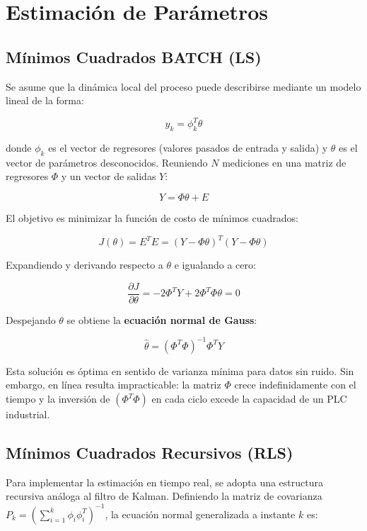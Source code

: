 \clearpage
\section{Estimación de Parámetros}

\subsection{Mínimos Cuadrados BATCH (LS)}

Se asume que la dinámica local del proceso puede describirse mediante un modelo lineal de la forma:

\[
  y_k = \phi_k^T \theta
\]

donde $\phi_k$ es el vector de regresores (valores pasados de entrada y salida) y $\theta$ es el vector de parámetros desconocidos. Reuniendo $N$ mediciones en una matriz de regresores $\Phi$ y un vector de salidas $Y$:

\[
  Y = \Phi\theta + E
\]

El objetivo es minimizar la función de costo de mínimos cuadrados:

\[
  J(\theta) = E^TE = (Y - \Phi\theta)^T(Y - \Phi\theta)
\]

Expandiendo y derivando respecto a $\theta$ e igualando a cero:

\[
  \frac{\partial J}{\partial \theta} = -2\Phi^TY + 2\Phi^T\Phi\theta = 0
\]

Despejando $\theta$ se obtiene la \textbf{ecuación normal de Gauss}:

\begin{equation}
  \hat{\theta} = (\Phi^T\Phi)^{-1}\Phi^T Y
  \label{eq:gauss-normal}
\end{equation}

Esta solución es óptima en sentido de varianza mínima para datos sin ruido. Sin embargo, en línea resulta impracticable: la matriz $\Phi$ crece indefinidamente con el tiempo y la inversión de $(\Phi^T\Phi)$ en cada ciclo excede la capacidad de un PLC industrial.

\subsection{Mínimos Cuadrados Recursivos (RLS)}

Para implementar la estimación en tiempo real, se adopta una estructura recursiva análoga al filtro de Kalman. Definiendo la matriz de covarianza $P_k = \left(\sum_{i=1}^k \phi_i\phi_i^T\right)^{-1}$, la ecuación normal generalizada a instante $k$ es:

